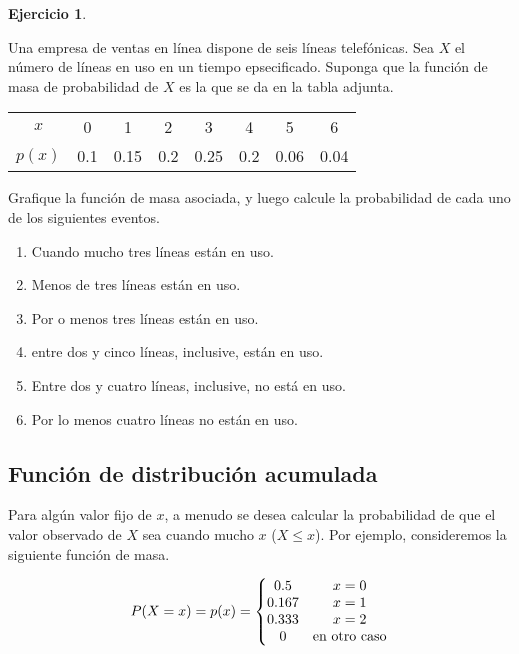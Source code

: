 \documentclass[
]{book}
\providecommand{\tightlist}{%
  \setlength{\itemsep}{0pt}\setlength{\parskip}{0pt}}
\theoremstyle{definition}
\theoremstyle{definition}
\theoremstyle{definition}
\newtheorem{exercise}{Ejercicio}[chapter]
\theoremstyle{definition}
\theoremstyle{remark}
\begin{document}
\begin{exercise}
\protect\hypertarget{exr:telefonica}{}\label{exr:telefonica}

Una empresa de ventas en línea dispone de seis líneas telefónicas. Sea \(X\) el número de líneas en uso en un tiempo epsecificado. Suponga que la función de masa de probabilidad de \(X\) es la que se da en la tabla adjunta.

\begin{table}[H]
\centering
\begin{tabular}{cccccccc}
\toprule
$x$ & 0 & 1 & 2 & 3 & 4 & 5 & 6\\
$p(x)$ & 0.1 & 0.15 & 0.2 & 0.25 & 0.2 & 0.06 & 0.04\\
\bottomrule
\end{tabular}
\end{table}

Grafique la función de masa asociada, y luego calcule la probabilidad de cada uno de los siguientes eventos.

\begin{enumerate}
\def\labelenumi{\alph{enumi}.}
\tightlist
\item
  Cuando mucho tres líneas están en uso.
\item
  Menos de tres líneas están en uso.
\item
  Por o menos tres líneas están en uso.
\item
  entre dos y cinco líneas, inclusive, están en uso.
\item
  Entre dos y cuatro líneas, inclusive, no está en uso.
\item
  Por lo menos cuatro líneas no están en uso.
\end{enumerate}

\end{exercise}

\hypertarget{funciuxf3n-de-distribuciuxf3n-acumulada}{%
\subsection{Función de distribución acumulada}\label{funciuxf3n-de-distribuciuxf3n-acumulada}}

Para algún valor fijo de \(x\), a menudo se desea calcular la probabilidad de que el valor observado de \(X\) sea cuando mucho \(x\) (\(X \leq x\)). Por ejemplo, consideremos la siguiente función de masa.

\begin{equation}
\notag
\begin{split}
P(X = x) = p(x) = \left\lbrace
\begin{matrix}
0.5 & x = 0\\
0.167 & x = 1\\
0.333 & x = 2\\
0 & \text{en otro caso}\\
\end{matrix}
\right.
\end{split}
\end{equation}
\end{document}
